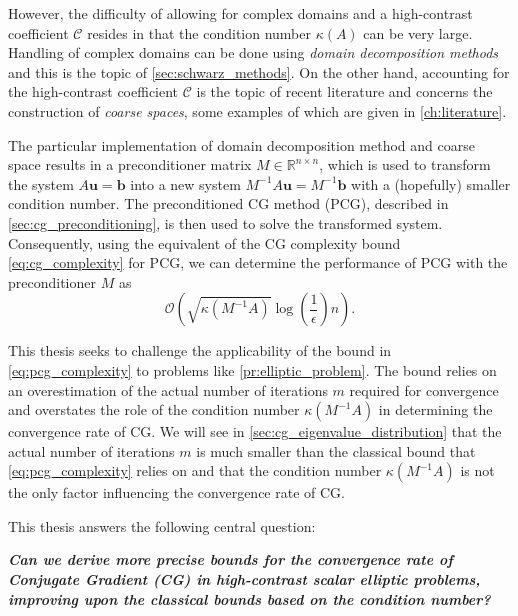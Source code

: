 However, the difficulty of allowing for complex domains and a high-contrast coefficient $\mathcal{C}$ resides in that the condition number $\kappa(A)$ can be very large. Handling of complex domains can be done using \textit{domain decomposition methods} and this is the topic of \cref{sec:schwarz_methods}. On the other hand, accounting for the high-contrast coefficient $\mathcal{C}$ is the topic of recent literature and concerns the construction of \textit{coarse spaces}, some examples of which are given in \cref{ch:literature}.

The particular implementation of domain decomposition method and coarse space results in a preconditioner matrix $M\in\mathbb{R}^{n \times n}$, which is used to transform the system $A\mathbf{u} = \mathbf{b}$ into a new system $M^{-1}A\mathbf{u} = M^{-1}\mathbf{b}$ with a (hopefully) smaller condition number. The preconditioned CG method (PCG), described in \cref{sec:cg_preconditioning}, is then used to solve the transformed system. Consequently, using the equivalent of the CG complexity bound \cref{eq:cg_complexity} for PCG, we can determine the performance of PCG with the preconditioner $M$ as
\begin{equation}
  \mathcal{O}\left(\sqrt{\kappa(M^{-1}A)}\log\left(\frac{1}{\epsilon}\right)n\right).
  \label{eq:pcg_complexity}
\end{equation}

This thesis seeks to challenge the applicability of the bound in \cref{eq:pcg_complexity} to problems like \cref{pr:elliptic_problem}. The bound relies on an overestimation of the actual number of iterations $m$ required for convergence and overstates the role of the condition number $\kappa(M^{-1}A)$ in determining the convergence rate of CG. We will see in \cref{sec:cg_eigenvalue_distribution} that the actual number of iterations $m$ is much smaller than the classical bound that \cref{eq:pcg_complexity} relies on and that the condition number $\kappa(M^{-1}A)$ is not the only factor influencing the convergence rate of CG. 

This thesis answers the following central question:
\vspace{0.5em}
\begin{center}
\textit{\textbf{Can we derive more precise bounds for the convergence rate of Conjugate Gradient (CG) in high-contrast scalar elliptic problems, improving upon the classical bounds based on the condition number?}}
\end{center}
\vspace{0.5em}

